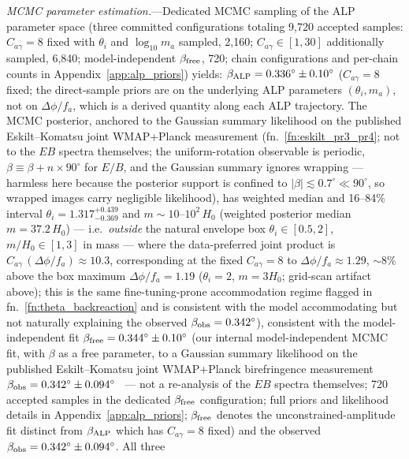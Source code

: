 \documentclass[aps,prd,twocolumn,superscriptaddress,showpacs,preprintnumbers,nofootinbib,longbibliography,floatfix]{revtex4-2}
\begin{document}
\textit{MCMC parameter estimation.}---Dedicated MCMC sampling of the ALP parameter
space (three committed configurations totaling 9{,}720 accepted samples:
$C_{a\gamma}=8$ fixed with $\theta_i$ and $\log_{10}m_a$ sampled, 2{,}160;
$C_{a\gamma}\in[1,30]$ additionally sampled, 6{,}840; model-independent
$\beta_{\rm free}$, 720; chain configurations and per-chain counts in
Appendix~\ref{app:alp_priors}) yields:
$\beta_{\rm ALP} = 0.336^\circ\pm 0.10^\circ$ ($C_{a\gamma}=8$ fixed; the
direct-sample priors are on the underlying ALP parameters $(\theta_i, m_a)$,
not on $\Delta\phi/f_a$, which is a derived quantity along each ALP trajectory.
The MCMC posterior, anchored to the
Gaussian summary likelihood on the published Eskilt--Komatsu joint
WMAP+Planck measurement (fn.~\ref{fn:eskilt_pr3_pr4}; not to the $EB$
spectra themselves; the uniform-rotation observable is periodic,
$\beta \equiv \beta + n\times 90^\circ$ for $E/B$, and the Gaussian
summary ignores wrapping --- harmless here because the posterior support
is confined to $|\beta| \lesssim 0.7^\circ \ll 90^\circ$, so wrapped
images carry negligible likelihood), has weighted median and 16--84\% interval
$\theta_i=1.317^{+0.439}_{-0.369}$ and
$m \sim 10$--$10^2\,H_0$ (weighted posterior median $m=37.2\,H_0$) --- i.e.\
\emph{outside} the natural envelope box $\theta_i\in[0.5,2]$,
$m/H_0\in[1,3]$ in mass --- where the data-preferred joint product is
$C_{a\gamma}\,(\Delta\phi/f_a)\approx 10.3$, corresponding at the fixed
$C_{a\gamma}=8$ to $\Delta\phi/f_a\approx 1.29$, ${\sim}8\%$ above the
box maximum $\Delta\phi/f_a = 1.19$ ($\theta_i=2$, $m=3H_0$; grid-scan
artifact above); this is the same fine-tuning-prone accommodation regime
flagged in fn.~\ref{fn:theta_backreaction}
and is consistent with the model accommodating but not naturally explaining
the observed $\beta_{\rm obs}=0.342^\circ$),
consistent with the model-independent fit $\beta_{\rm free} = 0.344^\circ\pm 0.10^\circ$ (our internal model-independent MCMC fit, with $\beta$ as a free parameter, to a Gaussian summary likelihood on the published Eskilt--Komatsu joint WMAP+Planck birefringence measurement $\beta_{\rm obs}=0.342^\circ\pm0.094^\circ$~\cite{Eskilt2022} --- not a re-analysis of the $EB$ spectra themselves; 720 accepted samples in the dedicated $\beta_{\rm free}$ configuration; full priors and likelihood details in Appendix~\ref{app:alp_priors}; $\beta_{\rm free}$ denotes the unconstrained-amplitude fit distinct from $\beta_{\rm ALP}$ which has $C_{a\gamma}=8$ fixed)
and the observed $\beta_{\rm obs} = 0.342^\circ\pm 0.094^\circ$. All three
\end{document}
